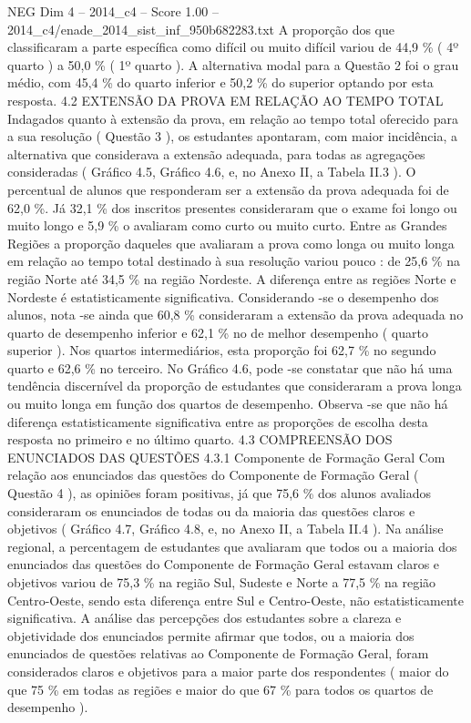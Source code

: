 \begin{textsample}{NEG Dim 4 – 2014\_c4 – Score 1.00 – 2014\_c4/enade\_2014\_sist\_inf\_950b682283.txt}
A proporção dos que classificaram a parte específica como difícil ou muito difícil variou de 44,9 \% ( 4º quarto ) a 50,0 \% ( 1º quarto ).
A alternativa modal para a Questão 2 foi o grau médio, com 45,4 \% do quarto inferior e 50,2 \% do superior optando por esta resposta. 4.2 EXTENSÃO DA PROVA EM RELAÇÃO AO TEMPO TOTAL Indagados quanto à extensão da prova, em relação ao tempo total oferecido para a sua resolução ( Questão 3 ), os estudantes apontaram, com maior incidência, a alternativa que considerava a extensão adequada, para todas as agregações consideradas ( Gráfico 4.5, Gráfico 4.6, e, no Anexo II, a Tabela II.3 ).
O percentual de alunos que responderam ser a extensão da prova adequada foi de 62,0 \%.
Já 32,1 \% dos inscritos presentes consideraram que o exame foi longo ou muito longo e 5,9 \% o avaliaram como curto ou muito curto.
Entre as Grandes Regiões a proporção daqueles que avaliaram a prova como longa ou muito longa em relação ao tempo total destinado à sua resolução variou pouco : de 25,6 \% na região Norte até 34,5 \% na região Nordeste.
A diferença entre as regiões Norte e Nordeste é estatisticamente significativa.
Considerando -se o desempenho dos alunos, nota -se ainda que 60,8 \% consideraram a extensão da prova adequada no quarto de desempenho inferior e 62,1 \% no de melhor desempenho ( quarto superior ).
Nos quartos intermediários, esta proporção foi 62,7 \% no segundo quarto e 62,6 \% no terceiro.
No Gráfico 4.6, pode -se constatar que não há uma tendência discernível da proporção de estudantes que consideraram a prova longa ou muito longa em função dos quartos de desempenho.
Observa -se que não há diferença estatisticamente significativa entre as proporções de escolha desta resposta no primeiro e no último quarto. 4.3 COMPREENSÃO DOS ENUNCIADOS DAS QUESTÕES 4.3.1 Componente de Formação Geral Com relação aos enunciados das questões do Componente de Formação Geral ( Questão 4 ), as opiniões foram positivas, já que 75,6 \% dos alunos avaliados consideraram os enunciados de todas ou da maioria das questões claros e objetivos ( Gráfico 4.7, Gráfico 4.8, e, no Anexo II, a Tabela II.4 ).
Na análise regional, a percentagem de estudantes que avaliaram que todos ou a maioria dos enunciados das questões do Componente de Formação Geral estavam claros e objetivos variou de 75,3 \% na região Sul, Sudeste e Norte a 77,5 \% na região Centro-Oeste, sendo esta diferença entre Sul e Centro-Oeste, não estatisticamente significativa.
A análise das percepções dos estudantes sobre a clareza e objetividade dos enunciados permite afirmar que todos, ou a maioria dos enunciados de questões relativas ao Componente de Formação Geral, foram considerados claros e objetivos para a maior parte dos respondentes ( maior do que 75 \% em todas as regiões e maior do que 67 \% para todos os quartos de desempenho ).

\end{textsample}
